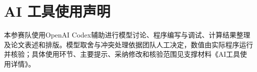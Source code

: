\section*{AI 工具使用声明}
本参赛队使用OpenAI Codex辅助进行模型讨论、程序编写与调试、计算结果整理及论文表述和排版。模型取舍与冲突处理依据团队人工决定，数值由实际程序运行并核验；具体使用环节、主要提示、采纳修改和核验范围见支撑材料《AI工具使用详情》。
